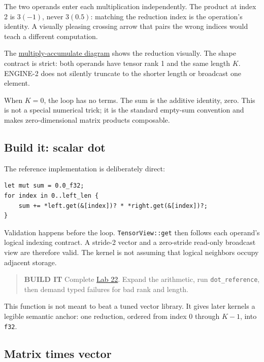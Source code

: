 \documentclass[
  10pt,
]{article}
\begin{document}
The two operands enter each multiplication independently. The product at
index 2 is \(3(-1)\), never \(3(0.5)\): matching the reduction index is
the operation's identity. A visually pleasing crossing arrow that pairs
the wrong indices would teach a different computation.

The
\href{https://github.com/hermonai/inside-the-llm-engine/blob/astra-visual-rewrite/diagrams/linear/dot-product-multiply-accumulate.txt}{multiply-accumulate
diagram} shows the reduction visually. The shape contract is strict:
both operands have tensor rank 1 and the same length \(K\). ENGINE-2
does not silently truncate to the shorter length or broadcast one
element.

When \(K=0\), the loop has no terms. The sum is the additive identity,
zero. This is not a special numerical trick; it is the standard
empty-sum convention and makes zero-dimensional matrix products
composable.

\subsection{Build it: scalar dot}\label{build-it-scalar-dot}

The reference implementation is deliberately direct:

\begin{verbatim}
let mut sum = 0.0_f32;
for index in 0..left_len {
    sum += *left.get(&[index])? * *right.get(&[index])?;
}
\end{verbatim}

Validation happens before the loop. \texttt{TensorView::get} then
follows each operand's logical indexing contract. A stride-2 vector and
a zero-stride read-only broadcast view are therefore valid. The kernel
is not assuming that logical neighbors occupy adjacent storage.

\begin{quote}
\textbf{BUILD IT} Complete
\href{https://github.com/hermonai/inside-the-llm-engine/blob/astra-visual-rewrite/labs/lab-22-dot-product.md}{Lab
22}. Expand the arithmetic, run \texttt{dot\_reference}, then demand
typed failures for bad rank and length.
\end{quote}

This function is not meant to beat a tuned vector library. It gives
later kernels a legible semantic anchor: one reduction, ordered from
index 0 through \(K-1\), into \texttt{f32}.

\subsection{Matrix times vector}\label{matrix-times-vector}
\end{document}
